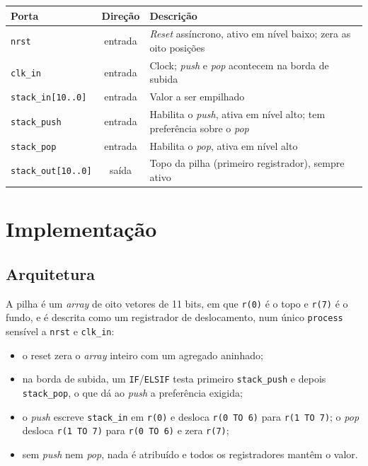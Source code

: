 \begin{quadro}[htb]
  \caption{Portas da pilha.}
  \label{quad:portas-stack}
  \centering
  \begin{tabular}{lcp{9cm}}
    \hline
    Porta & Direção & Descrição \\ \hline
    \texttt{nrst} & entrada & \textit{Reset} assíncrono, ativo em nível baixo; zera as oito posições \\
    \texttt{clk\_in} & entrada & Clock; \textit{push} e \textit{pop} acontecem na borda de subida \\
    \texttt{stack\_in[10..0]} & entrada & Valor a ser empilhado \\
    \texttt{stack\_push} & entrada & Habilita o \textit{push}, ativa em nível alto; tem preferência sobre o \textit{pop} \\
    \texttt{stack\_pop} & entrada & Habilita o \textit{pop}, ativa em nível alto \\
    \texttt{stack\_out[10..0]} & saída & Topo da pilha (primeiro registrador), sempre ativo \\ \hline
  \end{tabular}
\end{quadro}

\section{Implementação}

\subsection{Arquitetura}

A pilha é um \textit{array} de oito vetores de 11 bits, em que \texttt{r(0)} é o topo e \texttt{r(7)} é o fundo, e é descrita como um registrador de deslocamento, num único \texttt{process} sensível a \texttt{nrst} e \texttt{clk\_in}:

\begin{itemize}
  \item o reset zera o \textit{array} inteiro com um agregado aninhado;
  \item na borda de subida, um \texttt{IF}/\texttt{ELSIF} testa primeiro \texttt{stack\_push} e depois \texttt{stack\_pop}, o que dá ao \textit{push} a preferência exigida;
  \item o \textit{push} escreve \texttt{stack\_in} em \texttt{r(0)} e desloca \texttt{r(0 TO 6)} para \texttt{r(1 TO 7)}; o \textit{pop} desloca \texttt{r(1 TO 7)} para \texttt{r(0 TO 6)} e zera \texttt{r(7)};
  \item sem \textit{push} nem \textit{pop}, nada é atribuído e todos os registradores mantêm o valor.
\end{itemize}

